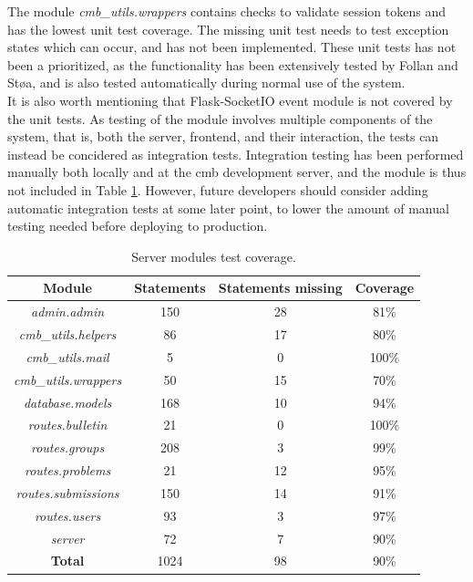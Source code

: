 The module \textit{cmb\_utils.wrappers} contains checks to validate session tokens and has the lowest unit test coverage. The missing unit test needs to test exception states which can occur, and has not been implemented. These unit tests has not been a prioritized, as the functionality has been extensively tested by Follan and Støa, and is also tested automatically during normal use of the system. \\

It is also worth mentioning that Flask-SocketIO event module is not covered by the unit tests. As testing of the module involves multiple components of the system, that is, both the server, frontend, and their interaction, the tests can instead be concidered as integration tests. Integration testing has been performed manually both locally and at the \gls{cmb} development server, and the module is thus not included in Table \ref{tab:server-module-coverage}. However, future developers should consider adding automatic integration tests at some later point, to lower the amount of manual testing needed before deploying to production.

\begin{table}[h!]
    \centering
    \begin{tabular}{c c c c}
      \hline
      \textbf{Module} & \textbf{Statements} & \textbf{Statements missing} & \textbf{Coverage} \\ \hline
      \textit{admin.admin} & 150 & 28 & 81\% \\
      \textit{cmb\_utils.helpers} & 86 & 17 & 80\% \\
      \textit{cmb\_utils.mail} & 5 & 0 & 100\% \\
      \textit{cmb\_utils.wrappers} & 50 & 15 & 70\% \\
      \textit{database.models} & 168 & 10 & 94\% \\
      \textit{routes.bulletin} & 21 & 0 & 100\% \\
      \textit{routes.groups} & 208 & 3 & 99\% \\
      \textit{routes.problems} & 21 & 12 & 95\% \\
      \textit{routes.submissions} & 150 & 14 & 91\% \\
      \textit{routes.users} & 93 & 3 & 97\% \\
      \textit{server} & 72 & 7 & 90\% \\ \hline
      \textbf{Total} & 1024 & 98 & 90\% \\ \hline
    \end{tabular}
    \caption{Server modules test coverage.}
    \label{tab:server-module-coverage}
\end{table}
